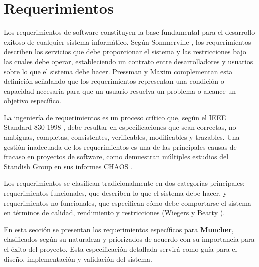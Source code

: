 \section*{Requerimientos}

Los requerimientos de software constituyen la base fundamental para el desarrollo exitoso de cualquier sistema informático. Según Sommerville \cite{Sommerville2016}, los requerimientos describen los servicios que debe proporcionar el sistema y las restricciones bajo las cuales debe operar, estableciendo un contrato entre desarrolladores y usuarios sobre lo que el sistema debe hacer. Pressman y Maxim \cite{PressmanMaxim2020} complementan esta definición señalando que los requerimientos representan una condición o capacidad necesaria para que un usuario resuelva un problema o alcance un objetivo específico.

La ingeniería de requerimientos es un proceso crítico que, según el IEEE Standard 830-1998 \cite{IEEE830-1998}, debe resultar en especificaciones que sean correctas, no ambiguas, completas, consistentes, verificables, modificables y trazables. Una gestión inadecuada de los requerimientos es una de las principales causas de fracaso en proyectos de software, como demuestran múltiples estudios del Standish Group en sus informes CHAOS \cite{StandishGroupCHAOS}.

Los requerimientos se clasifican tradicionalmente en dos categorías principales: requerimientos funcionales, que describen lo que el sistema debe hacer, y requerimientos no funcionales, que especifican cómo debe comportarse el sistema en términos de calidad, rendimiento y restricciones (Wiegers y Beatty \cite{Wiegers2013}).

En esta sección se presentan los requerimientos específicos para \textbf{Muncher}, clasificados según su naturaleza y priorizados de acuerdo con su importancia para el éxito del proyecto. Esta especificación detallada servirá como guía para el diseño, implementación y validación del sistema.

